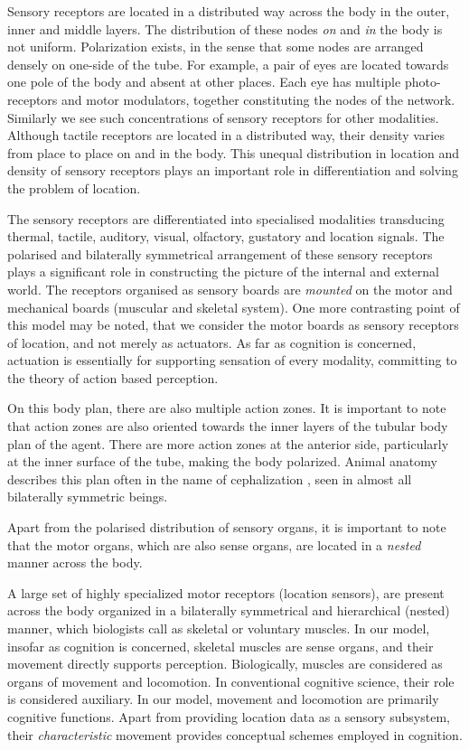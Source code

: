 Sensory receptors are located in a distributed way across the body in the outer, inner and middle layers. The distribution of these nodes \textit{on} and \textit{in} the body is not uniform. Polarization exists, in the sense that some nodes are arranged densely on one-side of the tube. For example, a pair of eyes are located towards one pole of the body and absent at other places. Each eye has multiple photo-receptors and motor modulators, together constituting the nodes of the network. Similarly we see such concentrations of sensory receptors for other modalities. Although tactile receptors are located in a distributed way, their density varies from place to place on and in the body. This unequal distribution in location and density of sensory receptors plays an important role in differentiation and solving the problem of location.

The sensory receptors are differentiated into specialised modalities transducing thermal, tactile, auditory, visual, olfactory, gustatory and location signals. The polarised and bilaterally symmetrical arrangement of these sensory receptors plays a significant role in constructing the picture of the internal and external world. The receptors organised as sensory boards are \textit{mounted} on the motor and mechanical boards (muscular and skeletal system). One more contrasting point of this model may be noted, that we consider the motor boards as sensory receptors of location, and not merely as actuators. As far as cognition is concerned, actuation is essentially for supporting sensation of every modality, committing to the theory of action based perception. 

On this body plan, there are also multiple action zones. It is important to note that action zones are also oriented towards the inner layers of the tubular body plan of the agent. There are more action zones at the anterior side, particularly at the inner surface of the tube, making the body polarized. Animal anatomy describes this plan often in the name of cephalization \cite{hyman1940invertebrates}, seen in almost all bilaterally symmetric beings. 

Apart from the polarised distribution of sensory organs, it is important to note that the motor organs, which are also sense organs, are located in a \textit{nested} manner across the body.

A large set of highly specialized motor receptors (location sensors), are present across the body organized in a bilaterally symmetrical and hierarchical (nested) manner, which biologists call as skeletal or voluntary muscles. In our model, insofar as cognition is concerned, skeletal muscles are sense organs, and their movement directly supports perception. Biologically, muscles are considered as organs of movement and locomotion. In conventional cognitive science, their role is considered auxiliary. In our model, movement and locomotion are primarily cognitive functions. Apart from providing location data as a sensory subsystem, their \textit{characteristic} movement provides conceptual schemes employed in cognition.

